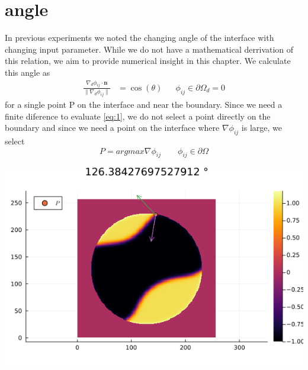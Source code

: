 \documentclass{mimosis}
\begin{document}
\chapter{angle}
\label{sec:org470675e}
In previous experiments we noted the changing angle of the interface with changing input parameter. While we do not have a mathematical derrivation of this relation, we aim to provide numerical insight in this chapter. We calculate this angle as
\begin{align}
\label{eq:1}
\frac{\nabla_d \phi_{ij} \cdot \mathbf{n}}{\|\nabla_{d} \phi_{ij}\|} &= \cos(\theta)& & \phi_{ij} \in \partial\Omega_{d} = 0
\end{align}
for a single point P on the interface and near the boundary. Since we need a finite diference to evaluate \ref{eq:1}, we do not select a point directly on the boundary and since we need a point on the interface where \(\nabla \phi_{ij}\) is large, we select
\begin{equation}
\label{eq:2}
P = argmax \nabla \phi_{ij} \qquad \phi_{ij} \in \partial \Omega
\end{equation}
\begin{center}
\includegraphics[width=.9\linewidth]{images/angle.png}
\label{}
\end{center}
\end{document}
